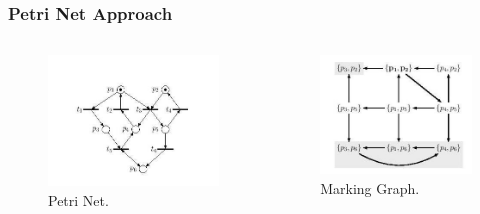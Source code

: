 \documentclass{beamer}
\begin{document}
\begin{frame}
\frametitle{Petri Net Approach}


\begin{columns}[c]

\begin{figure}
\includegraphics[width=\linewidth,height=\textheight,keepaspectratio]{loic_PN.jpg}
\caption{Petri Net.}
\end{figure}

\begin{figure}
\includegraphics[width=\linewidth,height=\textheight,keepaspectratio]{transition_graph.jpg}
\caption{Marking Graph.}
\end{figure}


\end{columns}
\end{frame}
\end{document}
